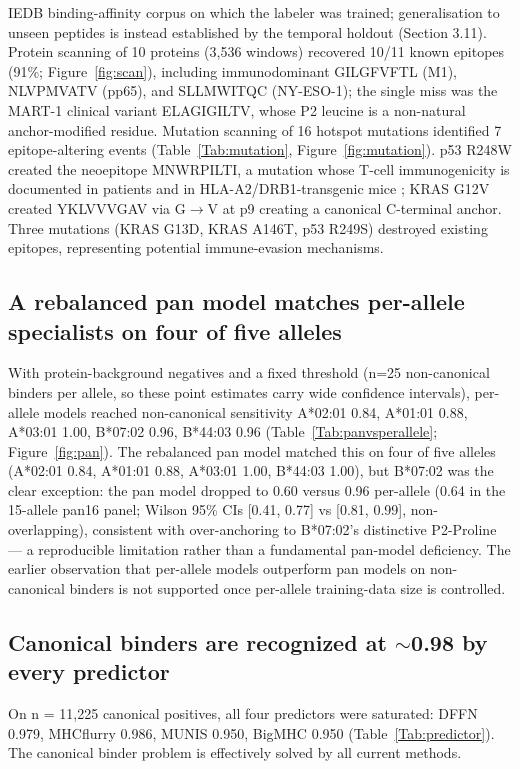 IEDB binding-affinity corpus on which the labeler was trained; generalisation to unseen peptides is instead established by the temporal holdout (Section 3.11). Protein scanning of 10 proteins (3,536 windows) recovered 10/11 known epitopes (91\%; Figure~\ref{fig:scan}), including immunodominant GILGFVFTL (M1), NLVPMVATV (pp65), and SLLMWITQC (NY-ESO-1); the single miss was the MART-1 clinical variant ELAGIGILTV, whose P2 leucine is a non-natural anchor-modified residue. Mutation scanning of 16 hotspot mutations identified 7 epitope-altering events (Table~\ref{Tab:mutation}, Figure~\ref{fig:mutation}). p53 R248W created the neoepitope MNWRPILTI, a mutation whose T-cell immunogenicity is documented in patients and in HLA-A2/DRB1-transgenic mice \citep{Malekzadeh20,Quandt18}; KRAS G12V created YKLVVVGAV via G$\rightarrow$V at p9 creating a canonical C-terminal anchor. Three mutations (KRAS G13D, KRAS A146T, p53 R249S) destroyed existing epitopes, representing potential immune-evasion mechanisms.

\subsection{A rebalanced pan model matches per-allele specialists on four of five alleles}
With protein-background negatives and a fixed threshold (n=25 non-canonical binders per allele, so these point estimates carry wide confidence intervals), per-allele models reached non-canonical sensitivity A*02:01 0.84, A*01:01 0.88, A*03:01 1.00, B*07:02 0.96, B*44:03 0.96 (Table~\ref{Tab:panvsperallele}; Figure~\ref{fig:pan}). The rebalanced pan model matched this on four of five alleles (A*02:01 0.84, A*01:01 0.88, A*03:01 1.00, B*44:03 1.00), but B*07:02 was the clear exception: the pan model dropped to 0.60 versus 0.96 per-allele (0.64 in the 15-allele pan16 panel; Wilson 95\% CIs [0.41, 0.77] vs [0.81, 0.99], non-overlapping), consistent with over-anchoring to B*07:02's distinctive P2-Proline --- a reproducible limitation rather than a fundamental pan-model deficiency. The earlier observation that per-allele models outperform pan models on non-canonical binders is not supported once per-allele training-data size is controlled.

\subsection{Canonical binders are recognized at $\sim$0.98 by every predictor}
On n = 11,225 canonical positives, all four predictors were saturated: DFFN 0.979, MHCflurry 0.986, MUNIS 0.950, BigMHC 0.950 (Table~\ref{Tab:predictor}). The canonical binder problem is effectively solved by all current methods.

